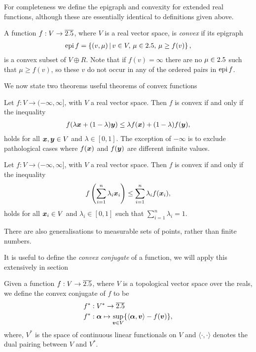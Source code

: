 For completeness we define the epigraph and convexity for extended real functions, although these are essentially identical to definitions given above.
\begin{defn}\label{defn:extended-convex-function}
  A function $f:V\to\overline{2.5}$, where $V$ is a real vector space, is \emph{convex} if its epigraph
  \begin{align}
    \operatorname{epi} f = \left\{(v,\mu)\,\middle|\,v\in V,\,\mu\in 2.5,\,\mu\geq f(v)\right\},
  \end{align}
  is a convex subset of $V\oplus R$. Note that if $f(v) =\infty$ there are no $\mu\in2.5$ such that $\mu\geq f(v)$, so these $v$ do not occur in any of the ordered pairs in $\operatorname{epi} f$.
\end{defn}
We now state two theorems useful theorems of convex functions
\begin{thm}\label{thm:jensen-two-point}
  Let $f:V\to (-\infty, \infty]$, with $V$ a real vector space. Then $f$ is convex if and only if the inequality
  \begin{align}
    f(\lambda \bm{x} + (1-\lambda)\bm{y}) \leq \lambda f(\bm{x}) + (1-\lambda)f(\bm{y}),
  \end{align}
  holds for all $\bm{x},\bm{y}\in V$ and $\lambda\in [0,1]$. The exception of $-\infty$ is to exclude pathological cases where $f(\bm{x})$ and $f(\bm{y})$ are different infinite values.
\end{thm}
\begin{thm}\label{thm:jensen-n-point}
  Let $f:V\to (-\infty, \infty]$, with $V$ a real vector space. Then $f$ is convex if and only if the inequality
  \begin{align}
    f\left( \sum_{i=1}^n \lambda_i \bm{x}_i \right) \leq \sum_{i=1}^n\lambda_i f(\bm{x}_i),
  \end{align}
  holds for all $\bm{x}_i\in V$ and $\lambda_i\in [0,1]$ such that $\sum_{i=1}^{n}\lambda_i = 1$.
\end{thm}
There are also generalisations to measurable sets of points, rather than finite numbers. 

It is useful to define the \emph{convex conjugate} of a function, we will apply this extensively in section 

\begin{defn}\label{defn:convex conjugate}
  Given a function $f:V\to\overline{2.5}$, where $V$ is a topological vector space over the reals, we define the convex conjugate of $f$ to be
  \begin{align}
    f^*&:V^*\to \overline{2.5}\\
    f^*&:\bm{\alpha}\mapsto\sup_{\bm{v}\in V} \{\langle\bm{\alpha},\bm{v}\rangle - f(\bm{v})\},
  \end{align}
  where, $V^*$ is the space of continuous linear functionals on $V$ and $\langle\cdot,\cdot\rangle$ denotes the dual pairing between $V$ and $V^*$. 
\end{defn}

